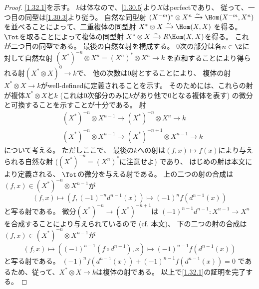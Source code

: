\documentclass[uplatex,dvipdfmx]{jsarticle}
\begin{document}
\begin{proof}
  \ref{1.32.1}を示す。
  \(k\)は体なので、\autoref{1.30.5}より\(X\)はperfectであり、
  従って、一つ目の同型は\autoref{1.30.3}より従う。
  自然な同型射
  \((X^{-m})^*\otimes X^n \xrightarrow{\sim} \Hom(X^{-m},X^n)\)
  を並べることによって、二重複体の同型射
  \(X^*\otimes X\xrightarrow{\sim}\Hom(X,X)\)
  を得る。
  \(\Tot\)を取ることによって複体の同型射
  \(X^*\otimes X \xrightarrow{\sim} R\Hom(X,X)\)を得る。
  これが二つ目の同型である。
  最後の自然な射を構成する。
  \(0\)次の部分は各\(n\in \Z\)に対して自然な射
  \((X^*)^{-n}\otimes X^n = (X^n)^*\otimes X^n \to k\)
  を直和することにより得られる射\((X^*\otimes X)^0\to k\)で、
  他の次数は\(0\)射とすることにより、
  複体の射\(X^*\otimes X \to k\)がwell-definedに定義されることを示す。
  そのためには、これらの射が複体\(X^*\otimes X\)と\(k\)
  (これは\(0\)次部分のみに\(k\)があり他で\(0\)となる複体を表す)
  の微分と可換することを示すことが十分である。
  射
  \begin{align*}
    &(X^*)^{-n}\otimes X^{n-1} \to (X^*)^{-n}\otimes X^n \to k \\
    &(X^*)^{-n}\otimes X^{n-1} \to (X^*)^{-n+1}\otimes X^{n-1} \to k
  \end{align*}
  について考える。
  ただしここで、
  最後の\(k\)への射は\((f,x)\mapsto f(x)\)により与えられる自然な射
  (\((X^*)^{-n}=(X^n)^*\)に注意せよ) であり、
  はじめの射は本文\cite[式 (1.9.3)]{kashiwara2002sheaves}により定義される、
  \(\Tot\)の微分を与える射である。
  上の二つの射の合成は\((f,x)\in (X^*)^{-n}\otimes X^{n-1}\)が
  \[(f,x)\mapsto (f,(-1)^{-n}d^{n-1}(x)) \mapsto (-1)^nf(d^{n-1}(x))\]
  と写る射である。
  微分\((X^*)^{-n}\to (X^*)^{-n+1}\)は
  \((-1)^{n-1}d^{n-1}:X^{n-1}\to X^n\)を合成することにより与えられているので
  (cf. 本文\cite[Remark 1.8.11]{kashiwara2002sheaves})、
  下の二つの射の合成は\((f,x)\in (X^*)^{-n}\otimes X^{n-1}\)が
  \[(f,x)\mapsto ((-1)^{n-1}(f\circ d^{n-1}),x) \mapsto (-1)^{n-1}f(d^{n-1}(x))\]
  と写る射である。
  \((-1)^nf(d^{n-1}(x))+(-1)^{n-1}f(d^{n-1}(x)) = 0\)
  であるため、従って、\(X^*\otimes X\to k\)は複体の射である。
  以上で\ref{1.32.1}の証明を完了する。


\end{proof}
\end{document}
